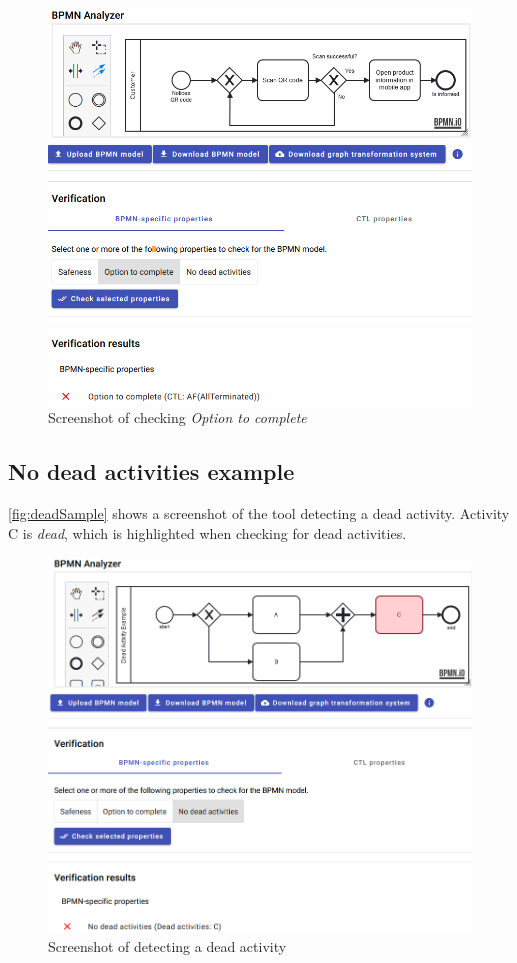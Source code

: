 \documentclass[runningheads]{llncs}
\begin{document}
\begin{figure}[ht]
    \centering
    \includegraphics[width=1\textwidth]{artifacts/appendix/option_to_complete_sample.png}
    \caption{Screenshot of checking \textit{Option to complete}}
    \label{fig:optionToCompleteSample}
\end{figure}

\subsection{No dead activities example}
\autoref{fig:deadSample} shows a screenshot of the tool detecting a dead activity.
Activity C is \textit{dead}, which is highlighted when checking for dead activities.

\begin{figure}[ht]
    \centering
    \includegraphics[width=1\textwidth]{artifacts/appendix/dead_sample.png}
    \caption{Screenshot of detecting a dead activity}
    \label{fig:deadSample}
\end{figure}
\end{document}
